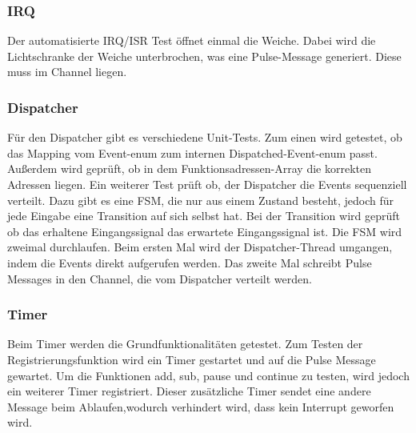 \documentclass[oneside,a4paper,titlepage]{scrartcl} %
\begin{document}
\subsubsection{IRQ}
Der automatisierte IRQ/ISR Test öffnet einmal die Weiche. Dabei wird die Lichtschranke der Weiche unterbrochen,
was eine Pulse-Message  generiert. Diese muss im Channel liegen.

\newpage

\subsubsection{Dispatcher}
Für den Dispatcher gibt es verschiedene Unit-Tests. Zum einen wird getestet,
ob das Mapping vom Event-enum zum internen Dispatched-Event-enum passt.
Außerdem wird geprüft, ob in dem Funktionsadressen-Array die korrekten Adressen liegen.
Ein weiterer Test prüft ob, der Dispatcher die Events sequenziell verteilt. Dazu gibt es eine
FSM, die nur aus einem Zustand besteht, jedoch für jede Eingabe eine Transition auf sich selbst hat.
Bei der Transition wird geprüft ob das erhaltene Eingangssignal das erwartete Eingangssignal ist.
Die FSM wird zweimal durchlaufen. Beim ersten Mal wird der Dispatcher-Thread umgangen, indem die Events
direkt aufgerufen werden. Das zweite Mal schreibt Pulse Messages in den Channel, die vom Dispatcher
verteilt werden.

\subsubsection{Timer}
Beim Timer werden die Grundfunktionalitäten getestet.\newline
Zum Testen der Registrierungsfunktion wird ein Timer gestartet und auf die Pulse Message gewartet.\newline
Um die Funktionen add, sub, pause und continue zu testen, wird jedoch ein weiterer Timer registriert.
Dieser zusätzliche Timer sendet eine andere Message beim Ablaufen,wodurch verhindert wird, dass kein Interrupt
geworfen wird.

\newpage

\end{document}
